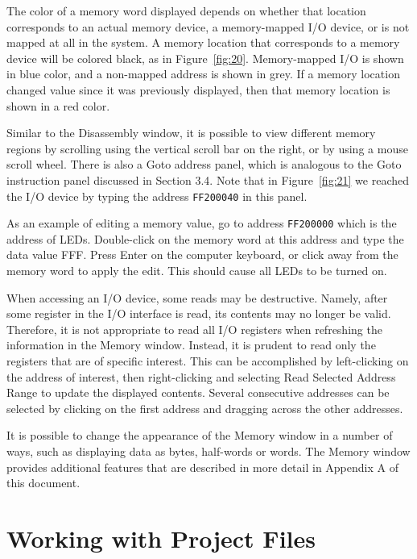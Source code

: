 \documentclass[11pt, twoside, pdftex]{article}
\begin{document}
The color of a memory word displayed depends on whether that
location corresponds to an actual memory device, a memory-mapped
I/O device, or is not mapped at all in the system. 
A memory location that corresponds to a memory device will be 
colored black, as in Figure~\ref{fig:20}. Memory-mapped I/O is shown in
blue color, and a non-mapped address is
shown in grey. If a memory location changed value since it was previously displayed, then
that memory location is shown in a red color.

Similar to the Disassembly window, it is possible to view
different memory regions by scrolling using the vertical scroll
bar on the right, or by using a mouse scroll wheel.
There is also a \textsf{Goto address} panel, which is
analogous to the \textsf{Goto instruction} panel discussed in Section 3.4. Note that in Figure~\ref{fig:21} we reached the I/O device
by typing the address \texttt{FF200040} in this panel.
  
As an example of editing a memory value, go to address
\texttt{FF200000} which is the address of LEDs.
Double-click on the memory word at this address 
and type the data value FFF. Press \textsf{Enter} on
the computer keyboard, or click away from the memory word to
apply the edit. This should cause all LEDs to be turned on. 

When accessing an I/O device, some reads may be destructive.
Namely, after some register in the I/O interface is read, its
contents may no longer be valid. Therefore, it is not
appropriate to read all I/O registers when refreshing the
information in the Memory window. Instead, it is prudent to read
only the registers that are of specific interest. This can be
accomplished  by left-clicking on the address of interest,
then right-clicking and selecting {\sf Read Selected Address Range} to update the displayed contents. Several
consecutive addresses can be selected by clicking on the first
address and dragging across the other addresses.

It is possible to change the appearance of the Memory window in a
number of ways, such as displaying data as bytes, half-words or
words. 
The Memory window provides additional features that are described
in more detail in Appendix A of this document.
 

\section{Working with Project Files}
\end{document}
